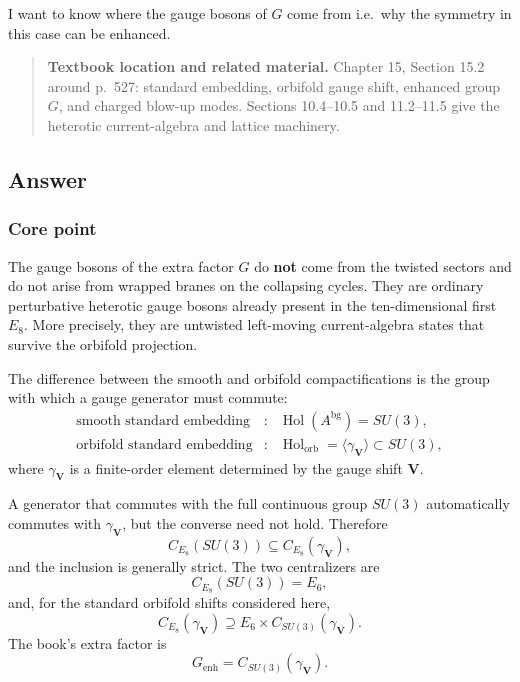 \documentclass[
  10pt,
  a4paper,
  openany]{book}
\begin{document}
I want to know where the gauge bosons of \(G\) come from i.e.~why the
symmetry in this case can be enhanced.

\begin{quote}
\textbf{Textbook location and related material.} Chapter 15, Section
15.2 around p.~527: standard embedding, orbifold gauge shift, enhanced
group \(G\), and charged blow-up modes. Sections 10.4--10.5 and
11.2--11.5 give the heterotic current-algebra and lattice machinery.
\end{quote}

\subsection{Answer}\label{answer-22}

\subsubsection{Core point}\label{core-point-22}

The gauge bosons of the extra factor \(G\) do \textbf{not} come from the
twisted sectors and do not arise from wrapped branes on the collapsing
cycles. They are ordinary perturbative heterotic gauge bosons already
present in the ten-dimensional first \(E_8\). More precisely, they are
untwisted left-moving current-algebra states that survive the orbifold
projection.

The difference between the smooth and orbifold compactifications is the
group with which a gauge generator must commute: \[
\begin{array}{ccl}
\text{smooth standard embedding}
&:&
\operatorname{Hol}(A^{\mathrm{bg}})=SU(3),
\\
\text{orbifold standard embedding}
&:&
\operatorname{Hol}_{\mathrm{orb}}
=
\langle\gamma_{\mathbf V}\rangle
\subset SU(3),
\end{array}
\] where \(\gamma_{\mathbf V}\) is a finite-order element determined by
the gauge shift \(\mathbf V\).

A generator that commutes with the full continuous group \(SU(3)\)
automatically commutes with \(\gamma_{\mathbf V}\), but the converse
need not hold. Therefore \[
C_{E_8}(SU(3))
\subseteq
C_{E_8}(\gamma_{\mathbf V}),
\] and the inclusion is generally strict. The two centralizers are \[
C_{E_8}(SU(3))=E_6,
\] and, for the standard orbifold shifts considered here, \[
C_{E_8}(\gamma_{\mathbf V})
\supseteq
E_6\times C_{SU(3)}(\gamma_{\mathbf V}).
\] The book's extra factor is \[
\boxed{
G_{\mathrm{enh}}
=
C_{SU(3)}(\gamma_{\mathbf V})
}.
\]
\end{document}
